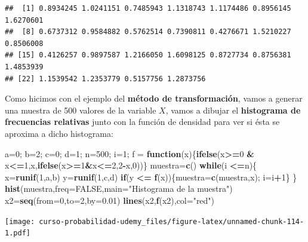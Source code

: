 \documentclass[]{book}
\newenvironment{Shaded}{\begin{snugshade}}{\end{snugshade}}
\newcommand{\ControlFlowTok}[1]{\textcolor[rgb]{0.13,0.29,0.53}{\textbf{#1}}}
\newcommand{\DataTypeTok}[1]{\textcolor[rgb]{0.13,0.29,0.53}{#1}}
\newcommand{\DecValTok}[1]{\textcolor[rgb]{0.00,0.00,0.81}{#1}}
\newcommand{\FloatTok}[1]{\textcolor[rgb]{0.00,0.00,0.81}{#1}}
\newcommand{\KeywordTok}[1]{\textcolor[rgb]{0.13,0.29,0.53}{\textbf{#1}}}
\newcommand{\NormalTok}[1]{#1}
\newcommand{\OperatorTok}[1]{\textcolor[rgb]{0.81,0.36,0.00}{\textbf{#1}}}
\newcommand{\OtherTok}[1]{\textcolor[rgb]{0.56,0.35,0.01}{#1}}
\newcommand{\StringTok}[1]{\textcolor[rgb]{0.31,0.60,0.02}{#1}}
\begin{document}
\begin{verbatim}
##  [1] 0.8934245 1.0241151 0.7485943 1.1318743 1.1174486 0.8956145 1.6270601
##  [8] 0.6737312 0.9584882 0.5762514 0.7390811 0.4276671 1.5210227 0.8506008
## [15] 0.4126257 0.9897587 1.2166050 1.6098125 0.8727734 0.8756381 1.4853939
## [22] 1.1539542 1.2353779 0.5157756 1.2873756
\end{verbatim}

Como hicimos con el ejemplo del \textbf{método de transformación}, vamos a generar una muestra de 500 valores de la variable \(X\), vamos a dibujar el \textbf{histograma de frecuencias relativas} junto con la función de densidad para ver si ésta se aproxima a dicho histograma:

\begin{Shaded}
\begin{Highlighting}[]
\NormalTok{a=}\DecValTok{0}\NormalTok{; b=}\DecValTok{2}\NormalTok{; c=}\DecValTok{0}\NormalTok{; d=}\DecValTok{1}\NormalTok{; n=}\DecValTok{500}\NormalTok{; i=}\DecValTok{1}\NormalTok{;}
\NormalTok{f =}\StringTok{ }\ControlFlowTok{function}\NormalTok{(x)\{}\KeywordTok{ifelse}\NormalTok{(x}\OperatorTok{>=}\DecValTok{0} \OperatorTok{&}\StringTok{ }\NormalTok{x}\OperatorTok{<=}\DecValTok{1}\NormalTok{,x,}\KeywordTok{ifelse}\NormalTok{(x}\OperatorTok{>=}\DecValTok{1}\OperatorTok{&}\NormalTok{x}\OperatorTok{<=}\DecValTok{2}\NormalTok{,}\DecValTok{2}\OperatorTok{-}\NormalTok{x,}\DecValTok{0}\NormalTok{))\}}
\NormalTok{muestra=}\KeywordTok{c}\NormalTok{()}
\ControlFlowTok{while}\NormalTok{(i }\OperatorTok{<=}\NormalTok{n)\{}
\NormalTok{  x=}\KeywordTok{runif}\NormalTok{(}\DecValTok{1}\NormalTok{,a,b)}
\NormalTok{  y=}\KeywordTok{runif}\NormalTok{(}\DecValTok{1}\NormalTok{,c,d)}
  \ControlFlowTok{if}\NormalTok{(y }\OperatorTok{<=}\StringTok{ }\KeywordTok{f}\NormalTok{(x))\{muestra=}\KeywordTok{c}\NormalTok{(muestra,x); i=i}\OperatorTok{+}\DecValTok{1}\NormalTok{\}}
\NormalTok{\}}
\KeywordTok{hist}\NormalTok{(muestra,}\DataTypeTok{freq=}\OtherTok{FALSE}\NormalTok{,}\DataTypeTok{main=}\StringTok{"Histograma de la muestra"}\NormalTok{)}
\NormalTok{x2=}\KeywordTok{seq}\NormalTok{(}\DataTypeTok{from=}\DecValTok{0}\NormalTok{,}\DataTypeTok{to=}\DecValTok{2}\NormalTok{,}\DataTypeTok{by=}\FloatTok{0.01}\NormalTok{)}
\KeywordTok{lines}\NormalTok{(x2,}\KeywordTok{f}\NormalTok{(x2),}\DataTypeTok{col=}\StringTok{"red"}\NormalTok{)}
\end{Highlighting}
\end{Shaded}

\texttt{[image: curso-probabilidad-udemy\_files/figure-latex/unnamed-chunk-114-1.pdf]}
\end{document}
